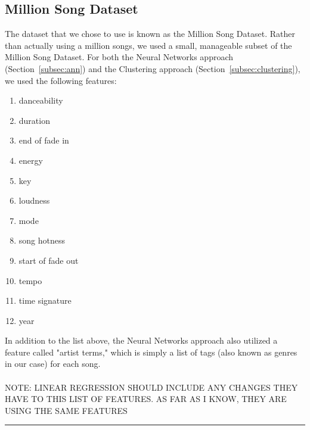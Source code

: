 \documentclass[12pt]{article}
\newcommand{\horizontalLine}{
	\begin{center}
		\hrule width 1.0\textwidth
	\end{center}
}
\begin{document}
\subsection{Million Song Dataset}
\label{subsec:datasetIntro}
The dataset that we chose to use is known as the Million Song Dataset. Rather than actually using a million songs, we used a small, manageable subset of the Million Song Dataset. For both the Neural Networks approach (Section~\ref{subsec:ann}) and the Clustering approach (Section~\ref{subsec:clustering}), we used the following features:
\begin{enumerate}
    \item danceability
    \vspace{-3.5mm}
    \item duration
    \vspace{-3.5mm}
    \item end of fade in
    \vspace{-3.5mm}
    \item energy
    \vspace{-3.5mm}
    \item key
    \vspace{-3.5mm}
    \item loudness
    \vspace{-3.5mm}
    \item mode
    \vspace{-3.5mm}
    \item song hotness
    \vspace{-3.5mm}
    \item start of fade out
    \vspace{-3.5mm} 
    \item tempo
    \vspace{-3.5mm}
    \item time signature
    \vspace{-3.5mm}
    \item year
\end{enumerate}

In addition to the list above, the Neural Networks approach also utilized a feature called "artist terms," which is simply a list of tags (also known as genres in our case) for each song. 
\\
\\
NOTE: LINEAR REGRESSION SHOULD INCLUDE ANY CHANGES THEY HAVE TO THIS LIST OF FEATURES. AS FAR AS I KNOW, THEY ARE USING THE SAME FEATURES

\horizontalLine
\end{document}
